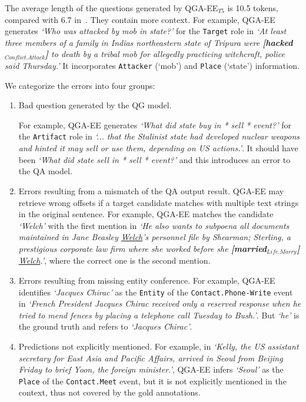The average length of the questions generated by QGA-EE$_{T5}$ is 10.5 tokens, compared with 6.7 in~\citet{du2020event}. They contain more context. 
For example, QGA-EE generates \textit{`Who was attacked by mob in state?'} for the \texttt{Target} role in \textit{`At least three members of a family in Indias northeastern state of Tripura were \textbf{[hacked$_{Conflict.Attack}$]} to death by a tribal mob for allegedly practicing witchcraft, police said Thursday.'} It incorporates  \texttt{Attacker} (`mob') and \texttt{Place} (`state') information.

We categorize the errors into four groups:
\begin{enumerate}
    \item Bad question generated by the QG model. 

    For example, QGA-EE generates \textit{`What did state buy in * sell * event?'} for the \texttt{Artifact} role in \textit{`... that the Stalinist state had developed nuclear weapons and hinted it may sell or use them, depending on US actions.'}. It should have been \textit{`What did state sell in * sell * event?'} and this introduces an error to the QA model.
    
     \item Errors resulting from a mismatch of the QA output result. QGA-EE may retrieve wrong offsets if a target candidate matches with multiple text strings in the original sentence. For example, QGA-EE matches the candidate \textit{`Welch'} with the first mention in \textit{`He also wants to subpoena all documents maintained in Jane Beasley \underline{Welch}'s personnel file by Shearman; Sterling, a prestigious corporate law firm where she worked before she \textbf{[married$_{Life.Marry}$]} \underline{Welch}.'}, where the correct one is the second mention.

     \item Errors resulting from missing entity conference. For example, QGA-EE identifies \textit{`Jacques Chirac'} as the \texttt{Entity} of the \texttt{Contact.Phone-Write} event in \textit{`French President Jacques Chirac received only a reserved response when he tried to mend fences by placing a telephone call Tuesday to Bush.'}. But \textit{`he'} is the ground truth and refers to \textit{`Jacques Chirac'}.

     \item Predictions not explicitly mentioned. For example, in \textit{`Kelly, the US assistant secretary for East Asia and Pacific Affairs, arrived in Seoul from Beijing Friday to brief Yoon, the foreign minister.'}, QGA-EE infers \textit{`Seoul'} as the \texttt{Place} of the \texttt{Contact.Meet} event, but it is not explicitly mentioned in the context, thus not covered by the gold annotations.
\end{enumerate}

